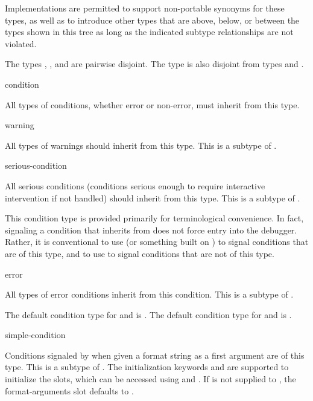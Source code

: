 Implementations are permitted to support non-portable synonyms for these
types, as well as to introduce other types that are above, below, or between
the types shown in this tree as long as the indicated subtype relationships
are not violated.

The types , , and  are pairwise
disjoint. The type  is also disjoint from types  and
.

\begin{defun}[Type]
condition

  All types of conditions, whether error or non-error, must inherit from 
  this type.
\end{defun}

\begin{defun}[Type]
warning

  All types of warnings should inherit from this type. 
  This is a subtype of .
\end{defun}

\begin{defun}[Type]
serious-condition

  All serious conditions (conditions serious enough to require interactive
  intervention if not handled) should inherit from this type. This is a
  subtype of .

  This condition type is provided primarily for terminological convenience.
  In fact, signaling a condition that inherits from  does
  not force entry into the debugger. Rather, it is conventional
  to use  (or something built on ) to signal conditions that are
  of this type, and to use  to signal conditions that are not of this
  type.
\end{defun}

\begin{defun}[Type]
error

  All types of error conditions inherit from this condition.
  This is a subtype of .
\end{defun}


The default condition type for  and  is .
The default condition type for  and  is .

\begin{defun}[Type]
simple-condition

  Conditions signaled by  when given a format string as a first
  argument are of this type. This is a subtype of .
  The initialization keywords  and  are supported
  to initialize the slots, which can be accessed using
   and .
  If  is not supplied to , the 
  format-arguments slot defaults to .
\end{defun}

